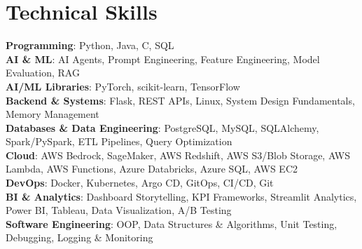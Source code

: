 \documentclass[letterpaper,11pt]{article}
\begin{document}
\section{Technical Skills}
 \begin{itemize}[leftmargin=0.15in, label={}]
    \small{\item{
     \textbf{Programming}{: Python, Java, C, SQL} \\
     \textbf{AI \& ML}{: AI Agents, Prompt Engineering, Feature Engineering, Model Evaluation, RAG} \\
     \textbf{AI/ML Libraries}{: PyTorch, scikit-learn, TensorFlow} \\
     \textbf{Backend \& Systems}{: Flask, REST APIs, Linux, System Design Fundamentals, Memory Management} \\
     \textbf{Databases \& Data Engineering}{: PostgreSQL, MySQL, SQLAlchemy, Spark/PySpark, ETL Pipelines, Query Optimization} \\
     \textbf{Cloud}{: AWS Bedrock, SageMaker, AWS Redshift, AWS S3/Blob Storage, AWS Lambda, AWS Functions, Azure Databricks, Azure SQL, AWS EC2} \\
     \textbf{DevOps}{: Docker, Kubernetes, Argo CD, GitOps, CI/CD, Git} \\
     \textbf{BI \& Analytics}{: Dashboard Storytelling, KPI Frameworks, Streamlit Analytics, Power BI, Tableau, Data Visualization, A/B Testing} \\
     \textbf{Software Engineering}{: OOP, Data Structures \& Algorithms, Unit Testing, Debugging, Logging \& Monitoring} \\
    }}
 \end{itemize}

\end{document}
